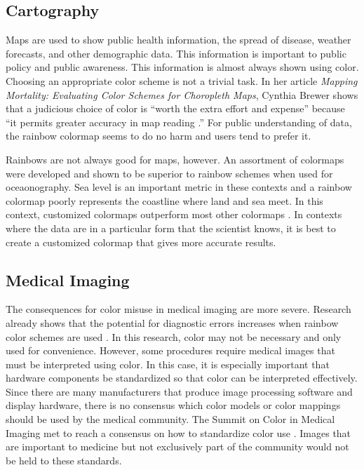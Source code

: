 \documentclass[journal,12pt]{IEEEtran}
\begin{document}
\subsection{Cartography}

Maps are used to show public health information, the spread of disease, weather
forecasts, and other demographic data. This information is important to
 public policy and public awareness. This information is almost always shown
 using color. Choosing an appropriate color scheme is not a trivial task. In her
article \textit{Mapping Mortality: Evaluating Color Schemes for Choropleth
Maps}, Cynthia Brewer shows that a judicious choice of color is ``worth 
the extra effort and expense'' because ``it permits greater accuracy in map
reading \cite{choropleth}.'' For public understanding of data, the rainbow colormap
seems to do no harm and users tend to prefer it.

Rainbows are not always good for maps, however. An assortment of colormaps were
developed and shown to be superior to rainbow schemes when used for oceaonography.
Sea level is an important metric in these contexts and a rainbow colormap poorly 
represents the coastline where land and sea meet. In this context, customized colormaps
outperform most other colormaps \cite{oceanography}. In contexts where the data are in a particular form
that the scientist knows, it is best to create a customized colormap that gives 
more accurate results.

\subsection{Medical Imaging}

The consequences for color misuse in medical imaging are more severe. Research
already shows that the potential for diagnostic errors increases when 
rainbow color schemes are used \cite{arteryvis}. In this research, color may not
be necessary and only used for convenience. However, some procedures require 
medical images that must be interpreted using color. In this case, it
is especially important that hardware components be standardized so that color
can be interpreted effectively. Since there are many manufacturers that produce
image processing software and display hardware, there is no consensus which 
color models or color mappings should be used by the medical community.
The Summit on Color in Medical Imaging
met to reach a consensus on how to standardize color use 
\cite{standardmedimg}. Images that are important to medicine but not exclusively
part of the community would not be held to these standards.
\end{document}
